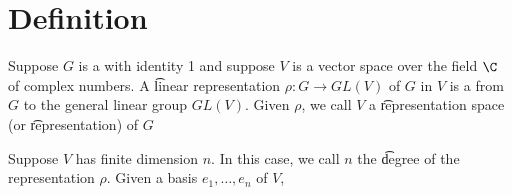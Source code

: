 

\section*{Definition}

Suppose $G$ is a with identity 1 and suppose $V$ is a vector space over the field $\C $ of complex numbers.
A \t{linear representation} $\rho : G \to GL(V)$ of $G$ in $V$ is a from $G$ to the general linear group $GL(V)$.
Given $\rho $, we call $V$ a \t{representation space} (or \t{representation}) of $G$

Suppose $V$ has finite dimension $n$.
In this case, we call $n$ the \t{degree} of the representation $\rho $.
Given a basis $e_1, \dots , e_n$ of $V$,

\blankpage